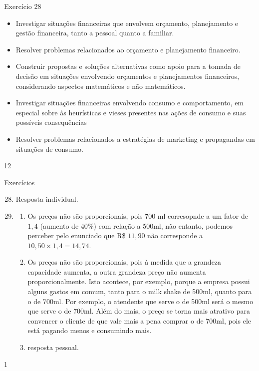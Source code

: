 \begin{objectives}{Exercício 28}
{
  \begin{itemize}
  \item Investigar situações financeiras que envolvem orçamento, planejamento e gestão financeira, tanto a pessoal quanto a familiar.
  \item Resolver problemas relacionados ao orçamento e planejamento financeiro. 
  \item Construir propostas e soluções alternativas como apoio para a tomada de decisão em situações envolvendo orçamentos e planejamentos financeiros, considerando aspectos matemáticos e não matemáticos.
  \end{itemize}


  \begin{itemize}
  \item Investigar situações financeiras envolvendo consumo e comportamento, em especial sobre às heurísticas e vieses presentes nas ações de consumo e suas possíveis consequências
  \item Resolver problemas relacionados a estratégias de marketing e propagandas em situações de consumo.
  \end{itemize}
}{1}{2}
\end{objectives}

\begin{answer}{Exercícios}
{\exerciselist

  \begin{enumerate}\setcounter{enumi}{27}
    \item Resposta individual.
    \item
    \begin{enumerate}
      \item Os preços não são proporcionais, pois 700 ml corresopnde a um fator de $1{,}4$ (aumento de $40$\%) com relação a 500ml, não entanto, podemos perceber pelo enunciado que R\$ $11{,}90$ não corresponde a $10{,}50\times1{,}4=14{,}74$.
      \item Os preços não são proporcionais, pois à medida que a grandeza capacidade aumenta, a outra grandeza preço não aumenta proporcionalmente. Isto acontece, por exemplo, porque a empresa possui alguns gastos em comum, tanto para o milk shake de 500ml, quanto para o de 700ml. Por exemplo, o atendente que serve o de 500ml será o mesmo que serve o de 700ml. Além do mais, o preço se torna mais atrativo para convencer o cliente de que vale mais a pena comprar o de 700ml, pois ele está pagando menos e consumindo mais.
      \item resposta pessoal.
    \end{enumerate}
  \end{enumerate}  
}{1}
\end{answer}
\exercise
\label{fin-exercise}


